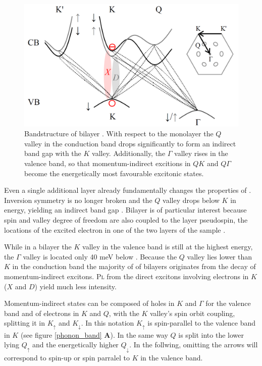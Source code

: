 \begin{figure}[t]
\centering
\includegraphics[width=.75\textwidth]{bilayerbands}
\caption{Bandstructure of bilayer \wse\!  \cite{lindlau_role_2017}. With respect to the monolayer the $Q$ valley in the conduction band drops significantly to form an indirect band gap with the $K$ valley. Additionally, the $\Gamma$ valley rises in the valence band, so that momentum-indirect excitions in $QK$ and $Q\Gamma$ become the energetically most favourable excitonic states.}
\label{bandgap}

\end{figure}

Even a single additional layer already fundamentally changes the properties of \wse\!. Inversion symmetry is no longer broken and the $Q$ valley drops below $K$ in energy, yielding an indirect band gap \cite{zibouche_transition-metal_2014_2}. Bilayer \wse is of particular interest because spin and valley degree of freedom are also coupled to the layer pseudospin, the locations of the excited electron in one of the two layers of the sample \cite{jones_spin-layer_2014}. 

While in a bilayer the $K$ valley in the valence band is still at the highest energy, the $\Gamma$ valley is located only 40 meV below \cite{wilson_determination_2017}. Because the $Q$ valley lies lower than $K$ in the conduction band the majority of \pl of \wse bilayers originates from the decay of momentum-indirect excitons. \textsc{Pl} from the direct excitons involving electrons in $K$ ($X$ and $D$) yield much less intensity.

Momentum-indirect states can be composed of holes in $K$ and $\Gamma$ for the valence band and of electrons in $K$ and $Q$, with the $K$ valley's spin orbit coupling, splitting it in $K_\uparrow$ and $K_\downarrow$. In this notation $K_\uparrow$ is spin-parallel to the valence band in $K$ (see figure \ref{phonon_band} \textbf{A}). In the same way $Q$ is split into the lower lying $Q_\uparrow$ and the energetically higher $Q_\downarrow$. In the follwing, omitting the arrows will correspond to spin-up or spin parralel to $K$ in the valence band.

